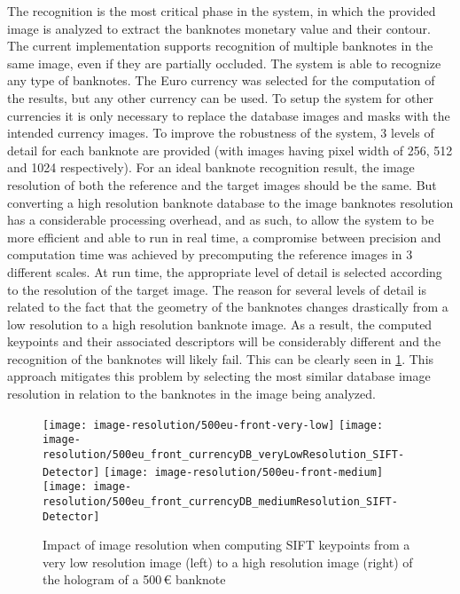 The recognition is the most critical phase in the system, in which the provided image is analyzed to extract the banknotes monetary value and their contour. The current implementation supports recognition of multiple banknotes in the same image, even if they are partially occluded. The system is able to recognize any type of banknotes. The Euro currency was selected for the computation of the results, but any other currency can be used. To setup the system for other currencies it is only necessary to replace the database images and masks with the intended currency images. To improve the robustness of the system, 3 levels of detail for each banknote are provided (with images having pixel width of 256, 512 and 1024 respectively). For an ideal banknote recognition result, the image resolution of both the reference and the target images should be the same. But converting a high resolution banknote database to the image banknotes resolution has a considerable processing overhead, and as such, to allow the system to be more efficient and able to run in real time, a compromise between precision and computation time was achieved by precomputing the reference images in 3 different scales. At run time, the appropriate level of detail is selected according to the resolution of the target image. The reason for several levels of detail is related to the fact that the geometry of the banknotes changes drastically from a low resolution to a high resolution banknote image. As a result, the computed keypoints and their associated descriptors will be considerably different and the recognition of the banknotes will likely fail. This can be clearly seen in \cref{fig:banknote-500-front-resolution-difference}. This approach mitigates this problem by selecting the most similar database image resolution in relation to the banknotes in the image being analyzed.

\begin{figure}[H]
	\centering
	\texttt{[image: image-resolution/500eu-front-very-low]}\hfill
	\texttt{[image: image-resolution/500eu\_front\_currencyDB\_veryLowResolution\_SIFT-Detector]}\hfill
	\texttt{[image: image-resolution/500eu-front-medium]}\hfill
	\texttt{[image: image-resolution/500eu\_front\_currencyDB\_mediumResolution\_SIFT-Detector]}
	\caption{Impact of image resolution when computing SIFT keypoints from a very low resolution image (left) to a high resolution image (right) of the hologram of a 500\,\euro{} banknote}
	\label{fig:banknote-500-front-resolution-difference}
\end{figure}


